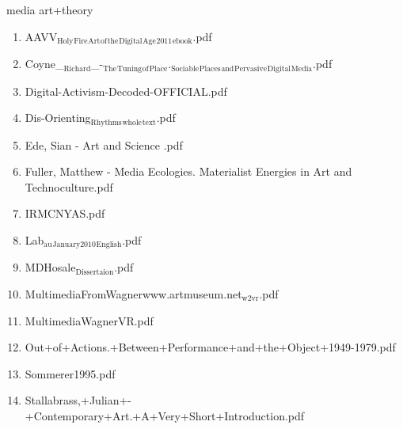\documentclass[11pt]{article}
\begin{document}
\item media art+theory
\label{sec-1-1-1-1-11-24}
\begin{enumerate}
\item AAVV$_{\text{Holy}}$$_{\text{Fire}}$$_{\text{Art}}$$_{\text{of}}$$_{\text{the}}$$_{\text{Digital}}$$_{\text{Age}}$$_{\text{2011}}$$_{\text{ebook}}$.pdf
\label{sec-1-1-1-1-11-24-1}

\item Coyne\_$_{\text{Richard}}$\_-$_{\text{The}}$$_{\text{Tuning}}$$_{\text{of}}$$_{\text{Place}}$.$_{\text{Sociable}}$$_{\text{Places}}$$_{\text{and}}$$_{\text{Pervasive}}$$_{\text{Digital}}$$_{\text{Media}}$.pdf
\label{sec-1-1-1-1-11-24-2}

\item Digital-Activism-Decoded-OFFICIAL.pdf
\label{sec-1-1-1-1-11-24-3}

\item Dis-Orienting$_{\text{Rhythms}}$$_{\text{whole}}$$_{\text{text}}$.pdf
\label{sec-1-1-1-1-11-24-4}

\item Ede, Sian - Art and Science \footnotemark[2]{}.pdf
\label{sec-1-1-1-1-11-24-5}

\item Fuller, Matthew - Media Ecologies. Materialist Energies in Art and Technoculture.pdf
\label{sec-1-1-1-1-11-24-6}

\item IRMCNYAS.pdf
\label{sec-1-1-1-1-11-24-7}

\item Lab$_{\text{au}}$$_{\text{January2010}}$$_{\text{English}}$.pdf
\label{sec-1-1-1-1-11-24-8}

\item MDHosale$_{\text{Dissertaion}}$.pdf
\label{sec-1-1-1-1-11-24-9}

\item MultimediaFromWagnerwww.artmuseum.net$_{\text{w2vr}}$.pdf
\label{sec-1-1-1-1-11-24-10}

\item MultimediaWagnerVR.pdf
\label{sec-1-1-1-1-11-24-11}

\item Out+of+Actions.+Between+Performance+and+the+Object+1949-1979.pdf
\label{sec-1-1-1-1-11-24-12}

\item Sommerer1995.pdf
\label{sec-1-1-1-1-11-24-13}

\item Stallabrass,+Julian+-+Contemporary+Art.+A+Very+Short+Introduction.pdf
\label{sec-1-1-1-1-11-24-14}


\end{enumerate}
\end{document}
